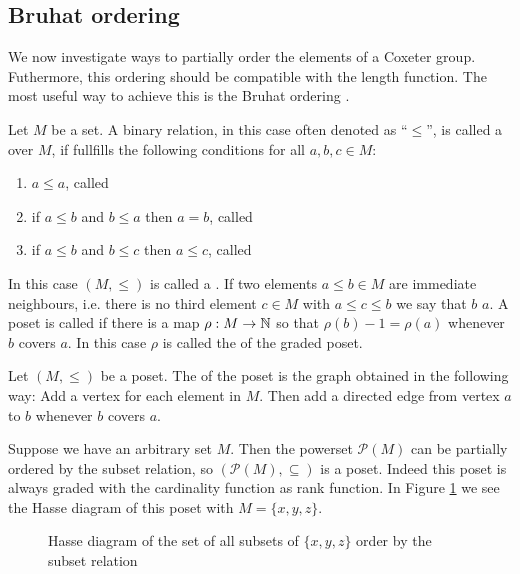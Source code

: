 \subsection{Bruhat ordering}
\label{sec:coxeter-groups-bruhat-ordering}

We now investigate ways to partially order the elements of a Coxeter group. Futhermore, this ordering should be compatible with the length function. The most useful way to achieve this is the Bruhat ordering \cite[Section 5.9]{humphreys:coxeter}.

\begin{defi}
	Let $M$ be a set. A binary relation, in this case often denoted as ``$\leq$'', is called a  over $M$, if fullfills the following conditions for all $a,b,c \in M$:
	\begin{enumerate}
		\item $a \leq a$, called 
		\item if $a \leq b$ and $b \leq a$ then $a=b$, called 
		\item if $a \leq b$ and $b \leq c$ then $a \leq c$, called 
	\end{enumerate}
	In this case $(M,\leq)$ is called a . If two elements $a \leq b \in M$ are immediate neighbours, i.e. there is no third element $c \in M$ with $a \leq c \leq b$ we say that $b$  $a$. A poset is called  if there is a map $\rho : M \to \mathbb{N}$ so that $\rho(b) - 1 = \rho(a)$ whenever $b$ covers $a$. In this case $\rho$ is called the  of the graded poset.
\end{defi}

\begin{defi}
	Let $(M,\leq)$ be a poset. The  of the poset is the graph obtained in the following way: Add a vertex for each element in $M$. Then add a directed edge from vertex $a$ to $b$ whenever $b$ covers $a$.
\end{defi}

\begin{exam}
	Suppose we have an arbitrary set $M$. Then the powerset $\mathcal P (M)$ can be partially ordered by the subset relation, so $(\mathcal P (M), \subseteq)$ is a poset. Indeed this poset is always graded with the cardinality function as rank function. In Figure \ref{fig:poset-xyz-subsets} we see the Hasse diagram of this poset with $M = \{x,y,z\}$.

	\begin{figure}[ht]
		\centering
		
		\caption{Hasse diagram of the set of all subsets of $\{x,y,z\}$ order by the subset relation}
		\label{fig:poset-xyz-subsets}
	\end{figure}
\end{exam}

